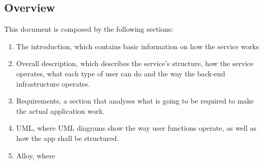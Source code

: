 \subsection{Overview}
	This document is composed by the following sections:
	\begin{enumerate}
	\item The introduction, which contains basic information on how the service works
	\item Overall description, which describes the service's structure, how the service operates, what each type of user can do and the way the
	back-end infrastructure operates. 
	\item Requirements, a section that analyses what is going to be required to make the actual application work.
	\item UML, where UML diagrams show the way user functions operate, as well as how the app shall be structured.
	\item Alloy, where \askpippo
	\end{enumerate}

